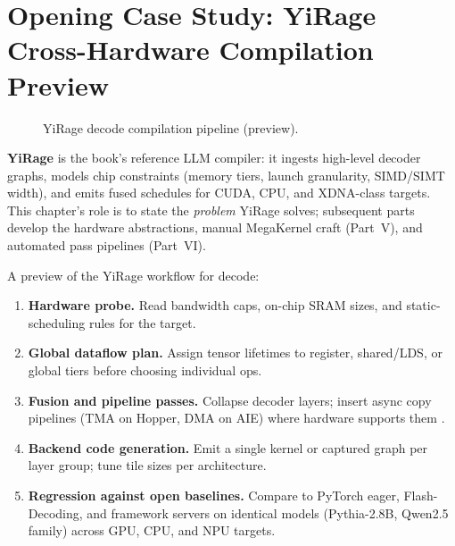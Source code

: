 \section{Opening Case Study: YiRage Cross-Hardware Compilation Preview}
\label{sec:yirage_preview}
\begin{figure}[t]
\centering
{}
\caption{YiRage decode compilation pipeline (preview).}
\label{fig:yirage_pipeline}
\end{figure}


\textbf{YiRage} is the book's reference  LLM compiler: it ingests high-level decoder graphs, models chip constraints (memory tiers, launch granularity, SIMD/SIMT width), and emits fused schedules for CUDA, CPU, and XDNA-class targets.
This chapter's role is to state the \emph{problem} YiRage solves; subsequent parts develop the hardware abstractions, manual MegaKernel craft (Part~V), and automated pass pipelines (Part~VI).

A preview of the YiRage workflow for decode:
\begin{enumerate}
\item \textbf{Hardware probe.} Read bandwidth caps, on-chip SRAM sizes, and static-scheduling rules for the target.
\item \textbf{Global dataflow plan.} Assign tensor lifetimes to register, shared/LDS, or global tiers before choosing individual ops.
\item \textbf{Fusion and pipeline passes.} Collapse decoder layers; insert async copy pipelines (TMA on Hopper, DMA on AIE) where hardware supports them \citep{nvidia2022hopper,amd2024aie}.
\item \textbf{Backend code generation.} Emit a single kernel or captured graph per layer group; tune tile sizes per architecture.
\item \textbf{Regression against open baselines.} Compare to PyTorch eager, Flash-Decoding, and framework servers on identical models (Pythia-2.8B, Qwen2.5 family) across GPU, CPU, and NPU targets.
\end{enumerate}

